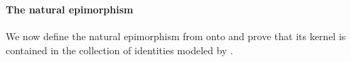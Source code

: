 \begin{code}
\AgdaSymbol{\}}\<%
\\
%
\\[\AgdaEmptyExtraSkip]%
%
\>[1]\AgdaSpace{}%
\AgdaSymbol{:}\AgdaSpace{}%
\AgdaSpace{}%
\AgdaSpace{}%
\AgdaSpace{}%
\AgdaSpace{}%
\AgdaSymbol{(}\AgdaSpace{}%
\AgdaSymbol{)}\AgdaSpace{}%
\AgdaSymbol{\AgdaUnderscore{}}\<%
\\
%
\>[1]\AgdaSpace{}%
\AgdaOperator{\AgdaFunction{𝔽[}}\AgdaSpace{}%
\AgdaSpace{}%
\AgdaOperator{\AgdaFunction{]}}\AgdaSpace{}%
\AgdaSymbol{=}\AgdaSpace{}%
\AgdaSpace{}%
\<%
\\
%
\>[1]\AgdaSpace{}%
\AgdaOperator{\AgdaFunction{𝔽[}}\AgdaSpace{}%
\AgdaSpace{}%
\AgdaOperator{\AgdaFunction{]}}\AgdaSpace{}%
\AgdaSymbol{=}\AgdaSpace{}%
\AgdaSpace{}%
\<%
\\
\>[1][@{}l@{\AgdaIndent{0}}]%
\>[2]\AgdaSpace{}%
\AgdaSymbol{:}\AgdaSpace{}%
\AgdaSpace{}%
\AgdaSymbol{\{}\AgdaSymbol{\}}\AgdaSpace{}%
\AgdaSpace{}%
\AgdaSpace{}%
\AgdaSpace{}%
\AgdaSpace{}%
\AgdaSymbol{(}\AgdaSpace{}%
\AgdaSymbol{)}\AgdaSpace{}%
\AgdaSpace{}%
\AgdaSpace{}%
\<%
\\
%
\>[2]\AgdaSpace{}%
\AgdaSpace{}%
\AgdaSymbol{(}\AgdaSpace{}%
\AgdaOperator{\AgdaInductiveConstructor{,}}\AgdaSpace{}%
\AgdaSymbol{)}%
\>[32]\AgdaSymbol{=}\AgdaSpace{}%
\AgdaSpace{}%
\AgdaSpace{}%
\<%
\\
%
\>[2]\AgdaSpace{}%
\AgdaSpace{}%
\AgdaSymbol{(}\AgdaSpace{}%
\AgdaOperator{\AgdaInductiveConstructor{,}}\AgdaSpace{}%
\AgdaSymbol{)}%
\>[32]\AgdaSymbol{=}\AgdaSpace{}%
\AgdaSpace{}%
\<%
\end{code}

\paragraph*{The natural epimorphism} %
We now define the natural epimorphism from  onto  %
and prove that its kernel is contained in the collection of identities modeled by  . %

